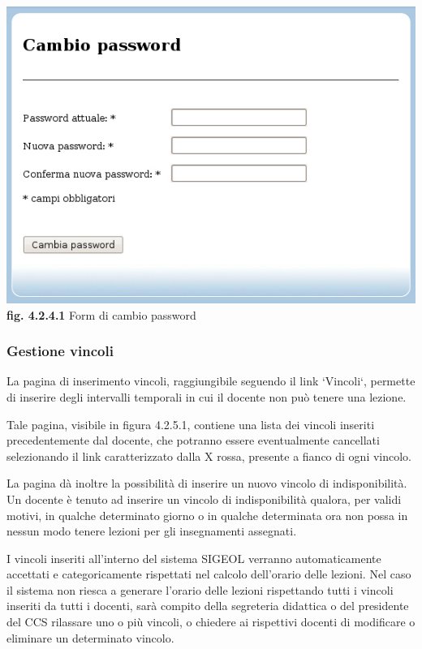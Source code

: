 \documentclass[11pt,a4paper]{article}
\begin{document}
\begin{center}
	\includegraphics[scale=0.5]{images/cambio_password.jpg}\\
	\textbf{fig. 4.2.4.1} Form di cambio password\\
\end{center}
\bigskip

\subsubsection{Gestione vincoli}
La pagina di inserimento vincoli, raggiungibile seguendo il link `Vincoli`, permette di inserire degli intervalli temporali in cui il docente non può tenere una lezione.

Tale pagina, visibile in figura 4.2.5.1, contiene una lista dei vincoli inseriti precedentemente dal docente, che potranno essere eventualmente cancellati selezionando il link caratterizzato dalla X rossa, presente a fianco di ogni vincolo.

La pagina dà inoltre la possibilità di inserire un nuovo vincolo di indisponibilità.
Un docente è tenuto ad inserire un vincolo di indisponibilità qualora, per validi motivi, in qualche determinato giorno o in qualche determinata ora non possa in nessun modo tenere lezioni per gli insegnamenti assegnati.

I vincoli inseriti all'interno del sistema SIGEOL verranno automaticamente accettati e categoricamente rispettati nel calcolo dell'orario delle lezioni.
Nel caso il sistema non riesca a generare l'orario delle lezioni rispettando tutti i vincoli inseriti da tutti i docenti, sarà compito della segreteria didattica o del presidente del CCS rilassare uno o più vincoli, o chiedere ai rispettivi docenti di modificare o eliminare un determinato vincolo.
\end{document}
